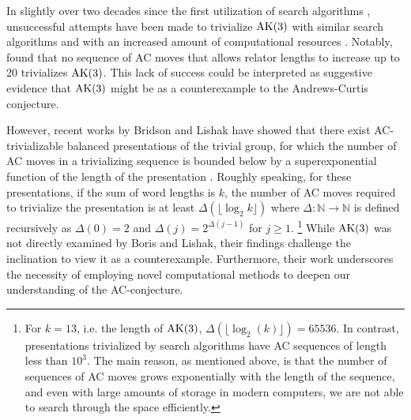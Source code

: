 In slightly over two decades since the first utilization of search algorithms \cite{genetic, bfs-ac}, unsuccessful attempts have been made to trivialize $\text{AK}(3)$ with similar search algorithms and with an increased amount of computational resources \cite{Bowman-McCaul, krawiec2016distance, Panteleev-Ushakov}. Notably, \cite{Panteleev-Ushakov} found that no sequence of AC moves that allows relator lengths to increase up to 20 trivializes $\text{AK}(3)$. 
This lack of success could be interpreted as suggestive evidence that $\text{AK}(3)$ might be as a counterexample to the Andrews-Curtis conjecture.
\newline 

However, recent works by Bridson and Lishak have showed that there exist AC-trivializable balanced presentations of the trivial group, for which the number of AC moves in a trivializing sequence is bounded below by a superexponential function of the length of the presentation \cite{Bridson, Lishak}.
Roughly speaking, for these presentations, if the sum of word lengths is $k$, the number of AC moves required to trivialize the presentation is at least $\Delta (\lfloor \log_2 k \rfloor)$ where $\Delta \colon \mathbb{N} \to \mathbb{N}$ is defined recursively as $\Delta(0) = 2$ and $\Delta (j) = 2^{\Delta(j-1)}$ for $j \geq 1$. 
\footnote{For $k=13$, i.e. the length of $\text{AK}(3)$, $\Delta (\lfloor \log_2 (k) \rfloor) = 65536$. In contrast, presentations trivialized by search algorithms have AC sequences of length less than $10^3$. The main reason, as mentioned above, is that the number of sequences of AC moves grows exponentially with the length of the sequence, and even with large amounts of storage in modern computers, we are not able to search through the space efficiently.}
While $\text{AK}(3)$ was not directly examined by Boris and Lishak, their findings challenge the inclination to view it as a counterexample. Furthermore, their work underscores the necessity of employing novel computational methods to deepen our understanding of the AC-conjecture.
\newline


